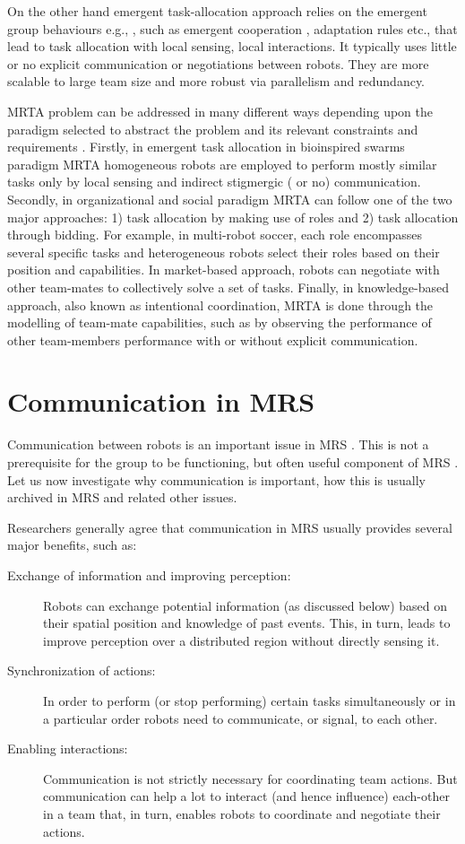 On the other hand emergent task-allocation approach relies on the emergent group behaviours e.g., \cite{Kube+1993}, such as emergent cooperation \cite{Lerman+2006}, adaptation rules \cite{Liu+2007} etc., that lead to task allocation with local sensing, local interactions. It typically uses little or no explicit communication or negotiations between robots. They are more scalable to large team size and more robust via parallelism and redundancy.

MRTA problem can be addressed in many different ways depending upon the paradigm selected to abstract the problem and its relevant constraints and requirements \cite{Parker2008}. Firstly, in emergent task allocation in bioinspired swarms paradigm MRTA homogeneous robots are employed to perform mostly similar tasks only by local sensing and indirect stigmergic ( or no) communication. Secondly, in organizational and social paradigm MRTA can follow one of the two major approaches: 1) task allocation by making use of roles and 2) task allocation through bidding. For example, in multi-robot soccer, each role encompasses several specific tasks and heterogeneous robots select their roles based on their position and capabilities. In market-based approach, robots can negotiate with other team-mates to collectively solve a set of tasks. Finally, in knowledge-based approach, also known as intentional coordination, MRTA is done through the modelling of team-mate capabilities, such as by observing the performance of other team-members performance with or without explicit communication.
\section{Communication in MRS}
\label{bg:mrs-comm}
Communication between robots is an  important issue in MRS \cite{Arkin1998}. This is not a prerequisite for the group to be functioning, but often useful component of MRS \cite{Mataric2007}. Let us now investigate why communication is important, how this is usually archived in MRS and related other issues.

Researchers generally agree that communication in MRS usually provides several major benefits, such as:

\begin{description}
\item[Exchange of information and improving perception:]
Robots  can exchange potential information (as discussed below) based on their spatial position and knowledge of past events. This, in turn, leads to improve perception over a distributed region without directly sensing it.
\item[Synchronization of actions:]
In order to perform (or stop performing) certain tasks simultaneously or in a particular order robots need to communicate, or signal, to each other. 
\item[Enabling interactions:]
Communication is not strictly necessary for coordinating team actions. But  communication can help a lot to interact (and hence influence) each-other in a team that, in turn, enables robots to coordinate and negotiate their actions.
\end{description}


